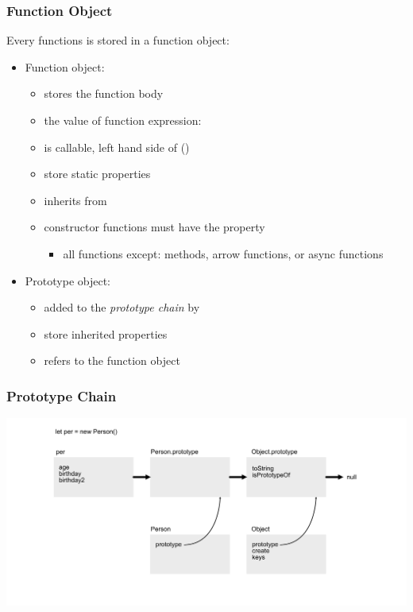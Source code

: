 \begin{frame}[fragile] \frametitle{Function Object}
Every functions is stored in a function object:
\begin{itemize}
  \item Function object:
  \begin{itemize}
    \item stores the function body
    \item the value of function expression: 
    \item is callable, left hand side of ()
    \item store static properties
    \item inherits from 
    \item constructor functions must have the property 
      \begin{itemize}
      \item all functions except: methods, arrow functions, or async functions
      \end{itemize}
  \end{itemize}
\end{itemize}
\begin{itemize}
  \item Prototype object:
  \begin{itemize}
    \item added to the \emph{prototype chain} by 
    \item store inherited properties
    \item {} refers to the function object
  \end{itemize}
\end{itemize}
\end{frame}

\begin{frame}[fragile]
\frametitle{Prototype Chain}
  \centering
  \includegraphics[width=14cm]{img/prototype_chain2}
\end{frame}

